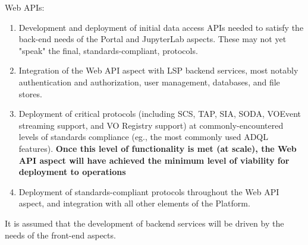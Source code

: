 Web APIs:
\begin{enumerate}
	\item Development and deployment of initial data access APIs needed to satisfy the back-end needs of the Portal and JupyterLab aspects. These may not yet "speak" the final, standards-compliant, protocols.
	\item Integration of the Web API aspect with LSP backend services, most notably authentication and authorization, user management, databases, and file stores.
	\item Deployment of critical protocols (including SCS, TAP, SIA, SODA, VOEvent streaming support, and VO Registry support) at commonly-encountered levels of standards compliance (eg., the most commonly used ADQL features). \textbf{Once this level of functionality is met (at scale), the Web API aspect will have achieved the minimum level of viability for deployment to operations}
	\item Deployment of standards-compliant protocols throughout the Web API aspect, and integration with all other elements of the Platform.
\end{enumerate}

It is assumed that the development of backend services will be driven by the needs of the front-end aspects.